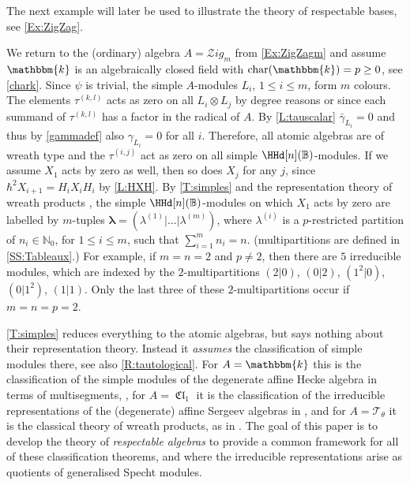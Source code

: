 \documentclass[a4paper,11pt]{amsart}
\newcommand\blam{{\boldsymbol\lambda}}
\numberwithin{equation}{subsection}
\theoremstyle{definition}
\theoremstyle{theorem}
\theoremstyle{remark}
\DeclareMathOperator\Cl{\mathfrak{Cl}}
\newcommand\Taft[1][\theta]{\mathscr{T}_{#1}}
\newcommand\op{\operatorname}
\newcommand\taui[1][i]{\tau^{(#1)}}
\newcommand\N{\mathbb{N}}
\newcommand\kk{\mathbbm{k}}
\newcommand{\Bo}{\mathbb{B}}
\begin{document}
The next example will later be used to illustrate the theory of respectable bases, see  \autoref{Ex:ZigZag}.

\begin{Example}\label{Ex:ZigZagSimples}
We return to the (ordinary) algebra $A=\mathcal{Z}ig_m$ from
\autoref{Ex:ZigZagm} and assume $\kk$ is an algebraically closed field
with $\op{char}(\kk)=p\ge0$, see \autoref{chark}. Since $\psi$ is
trivial, the simple $A$-modules $L_i$, $1\leq i\leq m$, form $m$
colours. The elements $\taui[k,l]$ acts as zero on all $L_i\otimes L_j$
by degree reasons or since each summand of $\taui[k,l]$ has a factor
in the radical of $A$. By  \autoref{L:tauscalar}  $\bar\gamma_{L_i}=0$ and thus by \autoref{gammadef} also $\gamma_{L_i}=0$ for all $i$.  Therefore, all atomic algebras are of wreath type and the $\tau^{(i,j)}$ act as zero on all simple $\HHd[n](\Bo)$-modules. If we assume $X_1$ acts by zero as well, then so does  $X_j$ for any $j$,
since $\hbar^2X_{i+1}=H_iX_iH_i$ by  \autoref{L:HXH}. By \autoref{T:simples} and the representation theory of wreath products \cite{CT:wreath}, the simple $\HHd[n](\Bo)$-modules on which $X_1$ acts by zero
 are labelled by $m$-tuples $\blam=(\lambda^{(1)}|\dots|\lambda^{(m)})$,
 where $\lambda^{(i)}$ is a
 $p$-restricted partition of $n_i\in\N_0$, for $1\le i\le m$, such that
 $\sum_{i=1}^mn_i=n$. (multipartitions are defined in
 \autoref{SS:Tableaux}.) For example, if $m=n=2$  and $p\ne2$, then there are $5$
 irreducible modules, which are indexed by the $2$-multipartitions $(2|0)$,
 $(0|2)$, $(1^2|0)$, $(0|1^2)$, $(1|1)$. Only the last three
 of these $2$-multipartitions occur if $m=n=p=2$.
\end{Example}

\begin{Remark}\label{Classdoesnothing}
\autoref{T:simples} reduces everything to the atomic algebras, but says nothing
  about their representation theory. Instead it \emph{assumes} the classification of simple modules there, see also \autoref{R:tautological}.  For $A=\kk$ this is the
  classification of the simple modules of the degenerate affine Hecke
  algebra in terms of multisegments, \cite{Zelevinsky:p-adic, Rogawski:Hecke},
  for $A=\Cl_1$ it is the
  classification of the irreducible representations of the (degenerate) affine Sergeev algebras in
  \cite{BKHeckeClifford,BK:proj}, and for $A=\Taft$ it is the classical theory
  of wreath products, as in \cite{CT:wreath,JamesKerber}.  The goal of this paper
  is to develop the theory of \emph{respectable algebras} to provide a
  common framework for all of these classification theorems, and where
  the irreducible representations arise as quotients of generalised Specht modules.
  \end{Remark}
\end{document}
